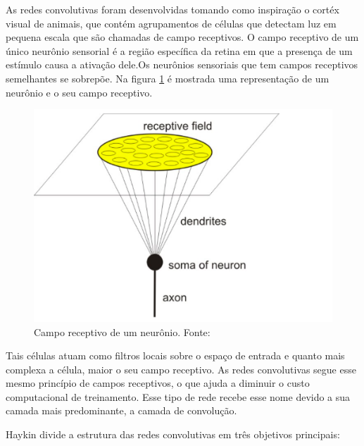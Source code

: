 As redes convolutivas  foram desenvolvidas tomando como inspiração o cortéx visual de animais, que contém  agrupamentos de células que detectam luz em pequena escala que são chamadas de campo receptivos. O campo receptivo de um único neurônio sensorial é a região específica da retina em que a presença de um estímulo causa a ativação dele.Os neurônios sensoriais que tem campos receptivos semelhantes se sobrepõe.
Na figura \ref{fig-campo} é mostrada uma representação de um neurônio e o seu campo receptivo. 
\begin{figure}[h]
	\centering
	\includegraphics[scale=0.4]{pasta1_figuras/campo_receptivo.png}
	\caption{Campo receptivo de um neurônio. Fonte: \cite{camporeceptivo}}
	
	\label{fig-campo}
\end{figure}

Tais células atuam como filtros locais sobre o espaço de entrada e quanto mais complexa a célula, maior o seu campo receptivo. As redes convolutivas segue esse mesmo princípio de campos receptivos, o que ajuda a diminuir o custo computacional de treinamento. Esse tipo de rede recebe esse nome devido a sua camada mais predominante, a camada de convolução.

Haykin \cite{haykin2009neural} divide a estrutura das redes convolutivas em três objetivos principais:

